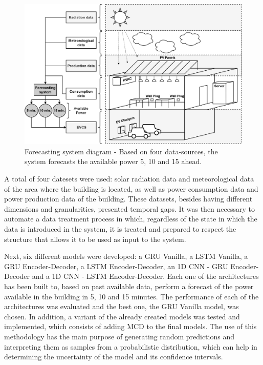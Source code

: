 \begin{figure}[h!]
    \centering
    \begin{center}
    \includegraphics[width=1\textwidth]{Images/BUILDING.png}
    \caption{Forecasting system diagram - Based on four data-sources, the system forecasts the available power 5, 10 and 15 ahead.}
    \label{building}
    \end{center}
\end{figure}


A total of four datesets were used: solar radiation data and meteorological data of the area where the building is located, as well as power consumption data and power production data of the building. These datasets, besides having different dimensions and granularities, presented temporal gaps. It was then necessary to automate a data treatment process in which, regardless of the state in which the data is introduced in the system, it is treated and prepared to respect the structure that allows it to be used as input to the system. 

Next, six different models were developed: a \ac{GRU} Vanilla, a \ac{LSTM} Vanilla, a \ac{GRU} Encoder-Decoder, a \ac{LSTM} Encoder-Decoder, an \ac{1D CNN} - \ac{GRU} Encoder-Decoder and a \ac{1D CNN} - \ac{LSTM} Encoder-Decoder. Each one of the architectures has been built to, based on past available data, perform a forecast of the power available in the building in 5, 10 and 15 minutes. The performance of each of the architectures was evaluated and the best one, the \ac{GRU} Vanilla model, was chosen. In addition, a variant of the already created models was tested and implemented, which consists of adding \ac{MCD} to the final models. The use of this methodology has the main purpose of generating random predictions and interpreting them as samples from a probabilistic distribution, which can help in determining the uncertainty of the model and its confidence intervals.

